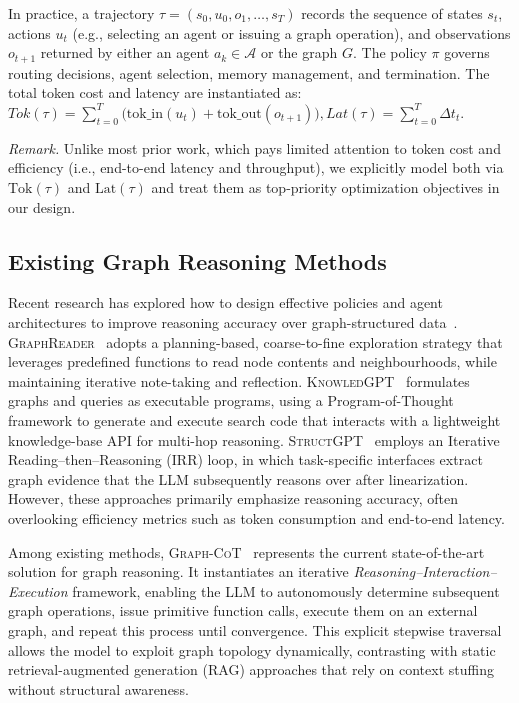 In practice, a trajectory $\tau=(s_0, u_0, o_1, \dots, s_T)$ records the sequence of states $s_t$, actions $u_t$ (e.g., selecting an agent or issuing a graph operation), and observations $o_{t+1}$ returned by either an agent $a_k \in \mathcal{A}$ or the graph $G$. 
The policy $\pi$ governs routing decisions, agent selection, memory management, and termination.
The total token cost and latency are instantiated as:
$
Tok(\tau)=\sum_{t=0}^{T}\!\big(\mathrm{tok\_in}(u_t)+\mathrm{tok\_out}(o_{t+1})\big), 
Lat(\tau)=\sum_{t=0}^{T}\!\Delta t_t.
$

\noindent\textit{Remark.} Unlike most prior work, which pays limited attention to token cost and efficiency (i.e., end-to-end latency and throughput), we explicitly model both via $\mathrm{Tok}(\tau)$ and $\mathrm{Lat}(\tau)$ and treat them as top-priority optimization objectives in our design.



\subsection{Existing Graph Reasoning Methods} 

Recent research has explored how to design effective policies and agent architectures to improve reasoning accuracy over graph-structured data~\cite{li2024graphreader, wang2023knowledgpt, jiang2023structgpt, jin2024graph}. 
\textsc{GraphReader}~\cite{li2024graphreader} adopts a planning-based, coarse-to-fine exploration strategy that leverages predefined functions to read node contents and neighbourhoods, while maintaining iterative note-taking and reflection. 
\textsc{KnowledGPT}~\cite{wang2023knowledgpt} formulates graphs and queries as executable programs, using a Program-of-Thought framework to generate and execute search code that interacts with a lightweight knowledge-base API for multi-hop reasoning. 
\textsc{StructGPT}~\cite{jiang2023structgpt} employs an Iterative Reading–then–Reasoning (IRR) loop, in which task-specific interfaces extract graph evidence that the LLM subsequently reasons over after linearization. 
However, these approaches primarily emphasize reasoning accuracy, often overlooking efficiency metrics such as token consumption and end-to-end latency.

Among existing methods, \textsc{Graph-CoT}~\cite{jin2024graph} represents the current state-of-the-art solution for graph reasoning. 
It instantiates an iterative \emph{Reasoning–Interaction–Execution} framework, enabling the LLM to autonomously determine subsequent graph operations, issue primitive function calls, execute them on an external graph, and repeat this process until convergence. 
This explicit stepwise traversal allows the model to exploit graph topology dynamically, contrasting with static retrieval-augmented generation (RAG) approaches that rely on context stuffing without structural awareness.


